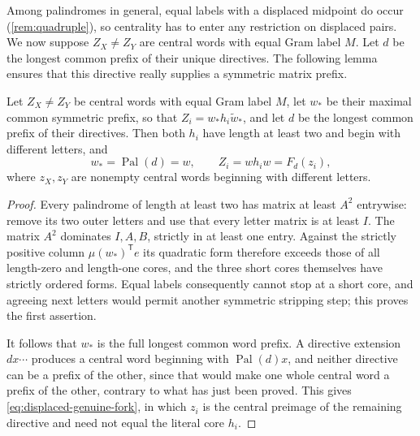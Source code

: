 Among palindromes in general, equal labels with a displaced midpoint do occur
(\cref{rem:quadruple}), so centrality has to enter any restriction on displaced pairs. We now
suppose $Z_X\ne Z_Y$ are central words with equal Gram label $M$. Let $d$ be the longest common prefix of their unique directives. The following lemma ensures that this directive really supplies a symmetric matrix prefix.

\begin{lemma}
\label{lem:common-prefix}
Let $Z_X\ne Z_Y$ be central words with equal Gram label $M$, let $w_*$ be
their maximal common symmetric prefix, so that $Z_i=w_*h_i\widetilde w_*$,
and let $d$ be the longest common prefix of their directives. Then both
$h_i$ have length at least two and begin with different letters, and
\begin{equation}
 w_*=\operatorname{Pal}(d)=w,\qquad
 Z_i=w h_iw=F_d(z_i),
 \label{eq:displaced-genuine-fork}
\end{equation}
where $z_X,z_Y$ are nonempty central words beginning with different
letters.
\end{lemma}

\begin{proof}
Every palindrome of length at least two has matrix at least $A^2$
entrywise: remove its two outer letters and use that every letter matrix
is at least $I$. The matrix $A^2$ dominates $I,A,B$, strictly in at least
one entry. Against the strictly positive column $\mu(w_*)^{\mathsf T}e$
its quadratic form therefore exceeds those of all length-zero and
length-one cores, and the three short cores themselves have strictly
ordered forms. Equal labels consequently cannot stop at a short core, and
agreeing next letters would permit another symmetric stripping step;
this proves the first assertion.

It follows that $w_*$ is the full longest common word prefix. A directive
extension $dx\cdots$ produces a central word beginning with
$\operatorname{Pal}(d)x$, and neither directive can be a prefix of the
other, since that would make one whole central word a prefix of the
other, contrary to what has just been proved. This gives
\eqref{eq:displaced-genuine-fork}, in which $z_i$ is the central preimage
of the remaining directive and need not equal the literal core $h_i$.
\end{proof}

